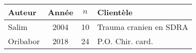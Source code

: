 \begin{table}
	\begin{tabular}{l c c l}

\hline
		Auteur	&	Année	&	$n$	& Clientèle	\\
\hline
		Salim	&	2004	&	10	&	Trauma cranien en SDRA\\
		Oribabor	&	2018	&	24	& P.O. Chir. card.\\
\hline

\end{tabular}
\end{table}
